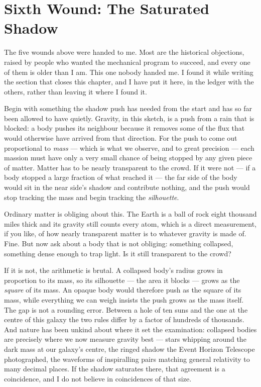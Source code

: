 \section{Sixth Wound: The Saturated Shadow}

The five wounds above were handed to me. Most are the historical objections, raised by people who wanted the mechanical program to succeed, and every one of them is older than I am. This one nobody handed me. I found it while writing the section that closes this chapter, and I have put it here, in the ledger with the others, rather than leaving it where I found it.

Begin with something the shadow push has needed from the start and has so far been allowed to have quietly. Gravity, in this sketch, is a push from a rain that is blocked: a body pushes its neighbour because it removes some of the flux that would otherwise have arrived from that direction. For the push to come out proportional to \emph{mass} --- which is what we observe, and to great precision --- each massion must have only a very small chance of being stopped by any given piece of matter. Matter has to be nearly transparent to the crowd. If it were not --- if a body stopped a large fraction of what reached it --- the far side of the body would sit in the near side's shadow and contribute nothing, and the push would stop tracking the mass and begin tracking the \emph{silhouette}.

Ordinary matter is obliging about this. The Earth is a ball of rock eight thousand miles thick and its gravity still counts every atom, which is a direct measurement, if you like, of how nearly transparent matter is to whatever gravity is made of. Fine. But now ask about a body that is not obliging: something collapsed, something dense enough to trap light. Is it still transparent to the crowd?

If it is not, the arithmetic is brutal. A collapsed body's radius grows in proportion to its mass, so its silhouette --- the area it blocks --- grows as the \emph{square} of its mass. An opaque body would therefore push as the square of its mass, while everything we can weigh insists the push grows as the mass itself. The gap is not a rounding error. Between a hole of ten suns and the one at the centre of this galaxy the two rules differ by a factor of hundreds of thousands. And nature has been unkind about where it set the examination: collapsed bodies are precisely where we now measure gravity best --- stars whipping around the dark mass at our galaxy's centre, the ringed shadow the Event Horizon Telescope photographed, the waveforms of inspiralling pairs matching general relativity to many decimal places. If the shadow saturates there, that agreement is a coincidence, and I do not believe in coincidences of that size.

